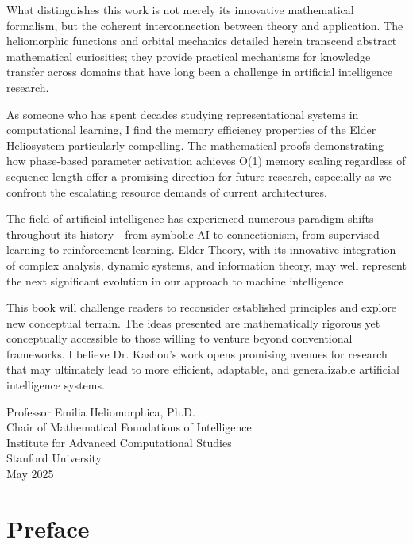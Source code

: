 \documentclass[11pt,twoside]{book}
\begin{document}
What distinguishes this work is not merely its innovative mathematical formalism, but the coherent interconnection between theory and application. The heliomorphic functions and orbital mechanics detailed herein transcend abstract mathematical curiosities; they provide practical mechanisms for knowledge transfer across domains that have long been a challenge in artificial intelligence research.

As someone who has spent decades studying representational systems in computational learning, I find the memory efficiency properties of the Elder Heliosystem particularly compelling. The mathematical proofs demonstrating how phase-based parameter activation achieves O(1) memory scaling regardless of sequence length offer a promising direction for future research, especially as we confront the escalating resource demands of current architectures.

The field of artificial intelligence has experienced numerous paradigm shifts throughout its history—from symbolic AI to connectionism, from supervised learning to reinforcement learning. Elder Theory, with its innovative integration of complex analysis, dynamic systems, and information theory, may well represent the next significant evolution in our approach to machine intelligence.

This book will challenge readers to reconsider established principles and explore new conceptual terrain. The ideas presented are mathematically rigorous yet conceptually accessible to those willing to venture beyond conventional frameworks. I believe Dr. Kashou's work opens promising avenues for research that may ultimately lead to more efficient, adaptable, and generalizable artificial intelligence systems.

\vspace{1cm}
\begin{flushright}
Professor Emilia Heliomorphica, Ph.D.\\
Chair of Mathematical Foundations of Intelligence\\
Institute for Advanced Computational Studies\\
Stanford University\\
May 2025
\end{flushright}

\chapter*{Preface}
\end{document}
